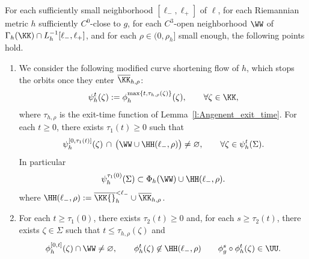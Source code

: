 \begin{Lemma}\label{l:deformation_lemma}
For each sufficiently small neighborhood $[\ell_-,\ell_+]$ of $\ell$, for each Riemannian metric $h$ sufficiently $C^0$-close to $g$, for each $C^3$-open neighborhood $\WW$ of $\Gamma_h(\KK)\cap L_h^{-1}[\ell_-,\ell_+]$, and for each $\rho\in(0,\rho_h]$ small enough, the following points hold.
\begin{enumerate}
\item\label{l:deformation_lemmai}
We consider the following modified curve shortening flow of $h$, which stops the orbits once they enter $\overline\KK_{h,\rho}$$:$
\begin{align*}
\psi_h^t(\zeta):=\phi_h^{\max\{t,\tau_{h,\rho}(\zeta)\}}(\zeta),\qquad\forall\zeta\in\KK,
\end{align*}
where $\tau_{h,\rho}$ is the exit-time function of Lemma~\ref{l:Angenent_exit_time}.
For each $t\geq0$, there exists $\tau_1(t)\geq0$ such that
\[
\psi_h^{[0,\tau_1(t)]}(\zeta)\, \cap\, \big(\WW\cup\HH(\ell_-,\rho)\big)\neq\varnothing,
\qquad
\forall \zeta\in\psi_h^t(\Sigma).
\]
In particular
\[
\psi_h^{\tau_1(0)}(\Sigma)
\subset
\Phi_h(\WW)\cup \HH(\ell_-,\rho).
\]
where $\HH(\ell_-,\rho):=
\overline\KK{}_{h}^{<\ell_-}\cup\overline\KK_{h,\rho}$.

\item\label{l:deformation_lemmaii}
For each $t\geq\tau_1(0)$, there exists $\tau_2(t)\geq0$ and, for each $s\geq\tau_2(t)$, there exists $\zeta\in\Sigma$ such that $t\leq\tau_{h,\rho}(\zeta)$ and
\begin{align*}
\phi_h^{[0,t]}(\zeta) \cap \WW\neq\varnothing,
\qquad
\phi_h^{t}(\zeta)\not\in\HH(\ell_-,\rho)
\qquad
\phi_g^s\circ\phi_h^t(\zeta)\in\UU.
\end{align*}
\end{enumerate}
\end{Lemma}

